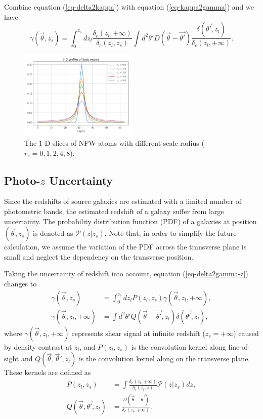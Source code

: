 \documentclass[twocolumn]{aastex62}
\newcommand{\vecb}[1]{{#1}}
\begin{document}
Combine equation (\ref{eq-delta2kappa}) with equation (\ref{eq-kappa2gamma}) and we have
\begin{equation}\label{eq-delta2gamma-z}
\vecb{\gamma}(\vec{\theta},z_s) = \int_0^{z_s} dz_l \frac{\delta_c(z_l,+\infty)}{\delta_{c}(z_l,z_s)} \int d^2 \theta'  \vecb{D}(\vec{\theta}-\vec{\theta'}) \frac{\delta(\vec{\theta'},z_l)}{\delta_c(z_l,+\infty)}.
\end{equation}

\begin{figure}
 \includegraphics[width=0.5\textwidth]{nfwlet-atom-1D.pdf}
 \caption{The $1$-D slices of NFW atoms with different scale radius ($r_s=0,1,2,4,8$).}
\end{figure}
\subsection{Photo-$z$ Uncertainty}
Since the redshifts of source galaxies are estimated with a limited number of photometric bands, the estimated redshift of a galaxy suffer from large uncertainty. The probability distribution function (PDF) of a galaxies at position $(\vec{\theta},z_s)$ is denoted as $\mathcal{P}(z|z_s)$.  Note that, in order to simplify the future calculation, we assume the variation of the PDF across the transverse plane is small and neglect the dependency on the transverse position.

Taking the uncertainty of redshift into account, equation (\ref{eq-delta2gamma-z}) changes to
\begin{equation}\label{eq-delta2gamma-poz}
\begin{split}
\gamma(\vec{\theta},z_s) &= \int_0^{z_s} dz_l P(z_l,z_s)\gamma(\vec{\theta},z_l,+\infty),\\
\gamma(\vec{\theta},z_l,+\infty)&= \int d^2 \theta'   Q(\vec{\theta}-\vec{\theta'},z_l) \delta(\vec{\theta'},z_l),
\end{split}
\end{equation}
where $\gamma(\vec{\theta},z_l,+\infty)$ represents shear signal at infinite redshift ($z_s=+\infty$) caused by density contrast at $z_l$, and $P(z_l,z_s)$ is the convolution kernel along line-of-sight and $Q(\vec{\theta},\vec{\theta}',z_l)$ is the convolution kernel along on the transverse plane. These kernels are defined as
\begin{equation}
\begin{split}
P(z_l,z_s)&=\int \frac{\delta_c(z_l,+\infty)}{\delta_{c}(z_l,z)} \mathcal{P}(z|z_s) dz,\\
Q(\vec{\theta},\vec{\theta'},z_l)&=\frac{\vecb{D}(\vec{\theta}-\vec{\theta'})}{\delta_c(z_l,+\infty)}.
\end{split}
\end{equation}
\end{document}
